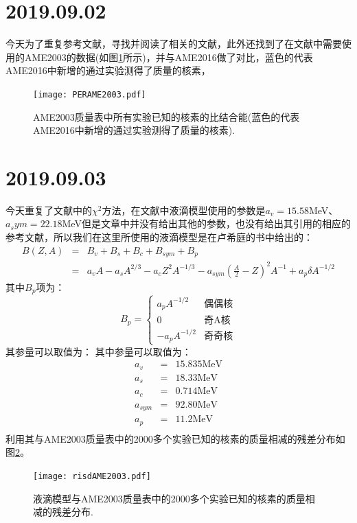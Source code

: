 \section{2019.09.02}
今天为了重复参考文献\cite{RN569}，寻找并阅读了相关的文献\cite{RN572,RN570}，此外还找到了在文献\cite{RN569}中需要使用的AME2003的数据(如图\ref{PERAME2003}所示)，并与AME2016做了对比，蓝色的代表AME2016中新增的通过实验测得了质量的核素，
\begin{figure}[H]
\centering
\texttt{[image: PERAME2003.pdf]}
\caption{AME2003质量表中所有实验已知的核素的比结合能(蓝色的代表AME2016中新增的通过实验测得了质量的核素).\label{PERAME2003}}
\end{figure}

\section{2019.09.03}
今天重复了文献\cite{RN569}中的$\chi^2$方法，在文献\cite{RN569}中液滴模型使用的参数是$a_v=15.58$MeV、$a_sym=22.18$MeV但是文章中并没有给出其他的参数，也没有给出其引用的相应的参考文献，所以我们在这里所使用的液滴模型是在卢希庭的书中给出的：
\begin{eqnarray*}
    B(Z,A)&=&B_v+B_s+B_c+B_{sym}+B_p\\
    &=&a_vA-a_sA^{2/3}-a_cZ^2A^{-1/3}-a_{sym}\left(\frac{A}{2}-Z\right)^2A^{-1}+a_p\delta A^{-1/2}
\end{eqnarray*}
其中$B_p$项为：
\begin{displaymath}
B_p= \left\{ \begin{array}{ll}
a_pA^{-1/2}& \textrm{偶偶核}\\
0 & \textrm{奇A核}\\
-a_pA^{-1/2} & \textrm{奇奇核}
\end{array} \right.
\end{displaymath}
其参量可以取值为：
其中参量可以取值为：
\begin{eqnarray*}
    a_v&=&15.835\textrm{MeV}\\
    a_s&=&18.33\textrm{MeV}\\
    a_c&=&0.714\textrm{MeV}\\
    a_{sym}&=&92.80\textrm{MeV}\\
    a_p&=&11.2\textrm{MeV}\\
\end{eqnarray*}
利用其与AME2003质量表中的2000多个实验已知的核素的质量相减的残差分布如图\ref{fig_risdAME2003}。
\begin{figure}[H]
\centering
\texttt{[image: risdAME2003.pdf]}
\caption{液滴模型与AME2003质量表中的2000多个实验已知的核素的质量相减的残差分布.\label{fig_risdAME2003}}
\end{figure}

